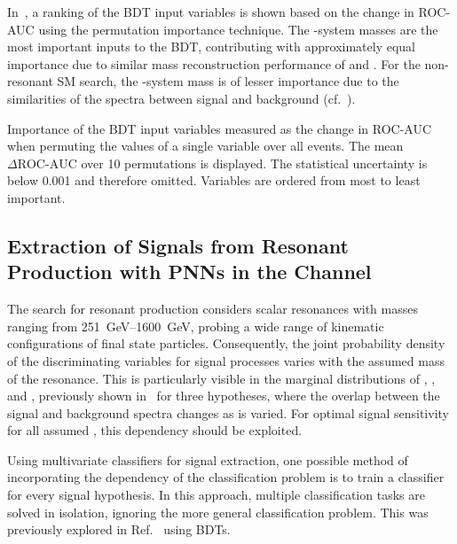 In~, a ranking of the BDT input variables is
shown based on the change in ROC-AUC using the permutation importance
technique. The \PHiggs-system masses are the most important inputs to the BDT,
contributing with approximately equal importance due to similar mass
reconstruction performance of \mMMC and \mBB. For the non-resonant SM \HH
search, the \HH-system mass is of lesser importance due to the similarities of
the \mHH spectra between signal and background (cf.~).

\begin{table}[htbp]
  \centering

  \caption[Importance of the BDT input variables for selecting events from
  SM~\HH production.]{Importance of the BDT input variables measured as the
    change in ROC-AUC when permuting the values of a single variable over all
    events. The mean $\Delta\text{ROC-AUC}$ over 10 permutations is
    displayed. The statistical uncertainty is below 0.001 and therefore
    omitted. Variables are ordered from most to least important.}%
  \label{tab:variable_importance_bdt}

  {
    \renewcommand{\arraystretch}{1.12}
    
  }
\end{table}


\subsection{Extraction of Signals from Resonant \HH Production with
  PNNs in the \hadhad Channel}%
\label{sec:mva_pnn}

The search for resonant \HH production considers scalar resonances
with masses ranging from \SIrange{251}{1600}{\GeV}, probing a wide
range of kinematic configurations of final state
particles. Consequently, the joint probability density of the
discriminating variables for signal processes varies with the assumed
mass of the resonance. This is particularly visible in the marginal
distributions of \mHH, \dRtautau, and \dRbb, previously shown
in~ for three \mX hypotheses, where the overlap
between the signal and background spectra changes as \mX is
varied. For optimal signal sensitivity for all assumed \mX, this
dependency should be exploited.

Using multivariate classifiers for signal extraction, one possible
method of incorporating the \mX dependency of the classification
problem is to train a classifier for every signal hypothesis. In this
approach, multiple classification tasks are solved in isolation,
ignoring the more general classification problem. This was previously
explored in Ref.~\cite{HIGG-2016-16-witherratum} using BDTs.

